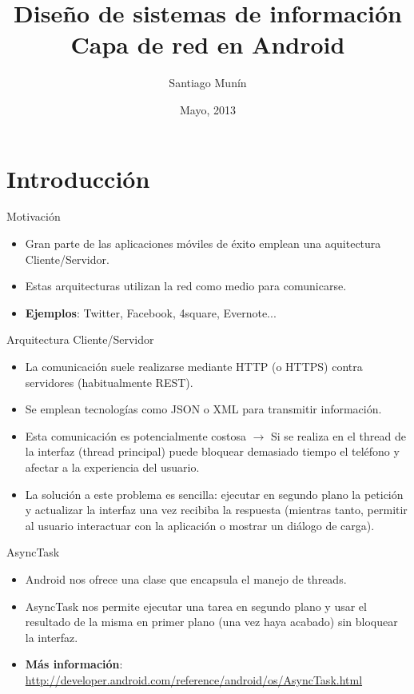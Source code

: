 \documentclass{beamer}
\title[Android: Diseño de la capa red]{Diseño de sistemas de información\\Capa de red en Android}
\author{Santiago Munín}
\institute{Universidade da Coruña}
\date{Mayo, 2013}
\begin{document}
\begin{frame}
\titlepage
\end{frame}

\section{Introducción}
\begin{frame}{Motivación}
\begin{itemize}
\item Gran parte de las aplicaciones móviles de éxito emplean una aquitectura Cliente/Servidor.
\item Estas arquitecturas utilizan la red como medio para comunicarse.
\item {\bf Ejemplos}: Twitter, Facebook, 4square, Evernote...
\end{itemize}
\end{frame}

\begin{frame}{Arquitectura Cliente/Servidor}
\begin{itemize}
\item La comunicación suele realizarse mediante HTTP (o HTTPS) contra servidores (habitualmente REST).
\item Se emplean tecnologías como JSON o XML para transmitir información.
\item Esta comunicación es potencialmente costosa $\rightarrow$ Si se realiza en el thread de la interfaz (thread principal) puede bloquear demasiado tiempo el teléfono y afectar a la experiencia del usuario.
\item La solución a este problema es sencilla: ejecutar en segundo plano la petición y actualizar la interfaz una vez recibiba la respuesta (mientras tanto, permitir al usuario interactuar con la aplicación o mostrar un diálogo de carga).
\end{itemize}
\end{frame}

\begin{frame}{AsyncTask}
\begin{itemize}
\item Android nos ofrece una clase que encapsula el manejo de threads.
\item AsyncTask nos permite ejecutar una tarea en segundo plano y usar el resultado de la misma en primer plano (una vez haya acabado) sin bloquear la interfaz.
\item {\bf Más información}: \url{http://developer.android.com/reference/android/os/AsyncTask.html}
\end{itemize}
\end{frame}
\end{document}

